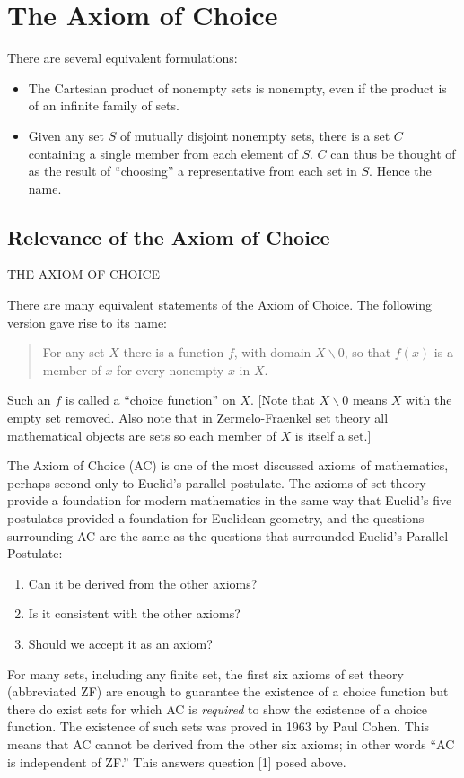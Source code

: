 \section{The Axiom of Choice}


 There are several equivalent formulations:

\begin{itemize}

    \item The Cartesian product of nonempty sets is nonempty, even
    if the product is of an infinite family of sets.

    \item Given any set $S$ of mutually disjoint nonempty sets, there is a set $C$
    containing a single member from each element of $S$.  $C$ can thus be
    thought of as the result of ``choosing'' a representative from each
    set in $S$. Hence the name.
\end{itemize}

\subsection{Relevance of the Axiom of Choice}
THE AXIOM OF CHOICE

There are many equivalent statements of the Axiom of Choice.  The following
version gave rise to its name:
\begin{quote}
  For any set $X$ there is a function $f$, with domain
  $X\backslash{0}$, so that $f(x)$ is a member of $x$ for every
  nonempty $x$ in $X$.
\end{quote}
Such an $f$ is called a ``choice function'' on $X$.  [Note that $X\backslash
 {0}$ means
$X$ with the empty set removed.  Also note that in Zermelo-Fraenkel set
theory all mathematical objects are sets so each member of $X$ is itself
a set.]

The Axiom of Choice (AC) is one of the most discussed axioms of mathematics,
perhaps second only to Euclid's parallel postulate.  The axioms of set theory
provide a foundation for modern mathematics in the same way that Euclid's five
postulates provided a foundation for Euclidean geometry, and the questions
surrounding AC are the same as the questions that surrounded Euclid's Parallel
Postulate:
\begin{enumerate}
 \item  Can it be derived from the other axioms?
 \item Is it consistent with the other axioms?
 \item Should we accept it as an axiom?
\end{enumerate}
For many sets, including any finite set, the first six axioms of set theory
(abbreviated ZF) are enough to guarantee the existence of a choice function
but there do exist sets for which AC is {\em required} to show the existence of
a choice function.  The existence of such sets was proved in 1963 by Paul
Cohen.  This means that AC cannot be derived from the other six axioms;
in other words ``AC is independent of ZF.''  This answers question [1] posed
above.

